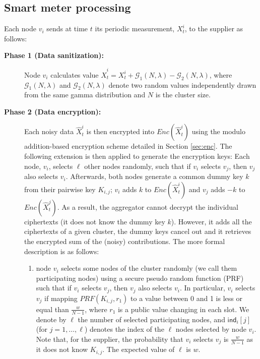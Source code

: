 \documentclass[11pt,a4paper]{article}
\theoremstyle{plain}
\theoremstyle{plain}
\theoremstyle{plain}
\theoremstyle{plain}
\theoremstyle{nonumberplain} \theoremseparator{}
\begin{document}
\subsection{Smart meter processing}
\label{sec:processing}
Each node $v_i$ sends at time $t$ its periodic measurement, $X^i_t$, to the supplier as follows:

\begin{description}
\item[\textbf{Phase 1 (Data sanitization):}]  
Node $v_i$ calculates value 
$\hat{X}_{t}^{i} = X_{t}^{i} + \mathcal{G}_{1}(N, \lambda) - \mathcal{G}_{2}(N, \lambda)$, 
where $\mathcal{G}_{1}(N, \lambda)$ and $\mathcal{G}_{2}(N, \lambda)$ denote two random 
values independently drawn from the same gamma distribution and $N$ is the cluster size. 


\item[\textbf{Phase 2 (Data encryption):}]  
Each noisy data $\hat{X}_{t}^{i}$ is then encrypted into  $\mathit{Enc}(\hat{X}_{t}^{i})$ using the modulo addition-based encryption scheme detailed in Section \ref{sec:enc}. The following extension is then applied to generate the encryption keys:
Each node, $v_i$, selects $\ell$ other nodes randomly, such that if $v_i$ selects $v_j$, then $v_j$ also selects $v_i$. 
Afterwards, both nodes generate a common dummy key $k$ from their pairwise key $K_{i,j}$; $v_i$ adds $k$ 
to $\mathit{Enc}(\hat{X}_{t}^{i})$ and $v_j$ adds $-k$ to $\mathit{Enc}(\hat{X}_{t}^{j})$. 
As a result, the aggregator cannot decrypt the individual ciphertexts (it does not know the dummy key $k$). However, it adds all
the ciphertexts of a given cluster, the dummy keys cancel out and it retrieves the encrypted sum of the (noisy) contributions.
The more formal description is as follows:

\begin{enumerate} 
\item node $v_i$ selects some nodes of the cluster randomly (we call them participating nodes) using a secure pseudo random function (PRF) such that if $v_i$ selects $v_j$, then $v_j$ also selects $v_i$. 
In particular, $v_i$ selects $v_j$ if mapping $\mathit{PRF}(K_{i,j}, r_{1})$ to a value between 0 and 1 is less or equal than $\frac{w}{N-1}$, where $r_{1}$ is a public value changing in each slot.
We denote by $\ell$ the number of selected participating nodes, and $\mathsf{ind}_i[j]$ (for $j=1, \ldots,\ell$)  denotes the index of the $\ell$ nodes selected by node $v_i$. Note that, for the supplier, the probability that $v_i$ selects $v_j$ is $\frac{w}{N-1}$ as it does not know $K_{i,j}$. The expected value of $\ell$ is $w$.


\end{enumerate}
\end{description}
\end{document}
